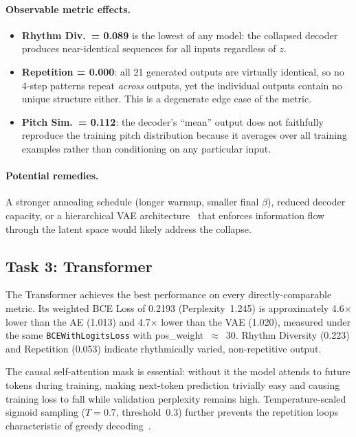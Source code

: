 \documentclass[letterpaper]{article}
\begin{document}
\paragraph{Observable metric effects.}
\begin{itemize}
  \item \textbf{Rhythm Div.\ = 0.089} is the lowest of any model:
        the collapsed decoder produces near-identical sequences for all
        inputs regardless of $z$.
  \item \textbf{Repetition = 0.000}: all 21 generated outputs are
        virtually identical, so no 4-step patterns repeat \emph{across}
        outputs, yet the individual outputs contain no unique structure
        either.  This is a degenerate edge case of the metric.
  \item \textbf{Pitch Sim.\ = 0.112}: the decoder's ``mean'' output does
        not faithfully reproduce the training pitch distribution because
        it averages over all training examples rather than conditioning
        on any particular input.
\end{itemize}

\paragraph{Potential remedies.}
A stronger annealing schedule (longer warmup, smaller final $\beta$),
reduced decoder capacity, or a hierarchical VAE
architecture~\cite{roberts2018musicvae} that enforces information flow
through the latent space would likely address the collapse.

\subsection{Task 3: Transformer}

The Transformer achieves the best performance on every directly-comparable
metric.  Its weighted BCE Loss of 0.2193 (Perplexity~1.245)
is approximately 4.6$\times$ lower than the AE (1.013) and 4.7$\times$
lower than the VAE (1.020), measured under the same
\texttt{BCEWithLogitsLoss} with pos\_weight~$\approx$~30.
Rhythm Diversity (0.223) and Repetition (0.053) indicate rhythmically
varied, non-repetitive output.

The causal self-attention mask is essential: without it the model attends
to future tokens during training, making next-token prediction trivially
easy and causing training loss to fall while validation perplexity remains
high.  Temperature-scaled sigmoid sampling ($T = 0.7$, threshold~0.3)
further prevents the repetition loops characteristic of greedy
decoding~\cite{huang2019musictransformer}.
\end{document}
